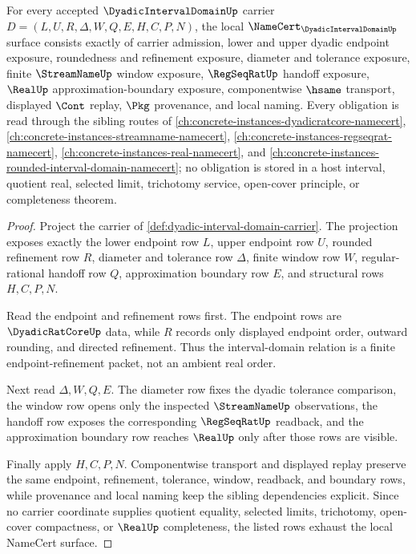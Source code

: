 \begin{theorem}
\label{thm:dyadic-interval-domain-namecert-obligations}
For every accepted $\DyadicIntervalDomainUp$ carrier $D=(L,U,R,\Delta,W,Q,E,H,C,P,N)$, the local $\NameCert_{\DyadicIntervalDomainUp}$ surface consists exactly of carrier admission, lower and upper dyadic endpoint exposure, roundedness and refinement exposure, diameter and tolerance exposure, finite $\StreamNameUp$ window exposure, $\RegSeqRatUp$ handoff exposure, $\RealUp$ approximation-boundary exposure, componentwise $\hsame$ transport, displayed $\Cont$ replay, $\Pkg$ provenance, and local naming. Every obligation is read through the sibling routes of \autoref{ch:concrete-instances-dyadicratcore-namecert}, \autoref{ch:concrete-instances-streamname-namecert}, \autoref{ch:concrete-instances-regseqrat-namecert}, \autoref{ch:concrete-instances-real-namecert}, and \autoref{ch:concrete-instances-rounded-interval-domain-namecert}; no obligation is stored in a host interval, quotient real, selected limit, trichotomy service, open-cover principle, or completeness theorem.
\end{theorem}
\begin{proof}
Project the carrier of \autoref{def:dyadic-interval-domain-carrier}. The projection exposes exactly the lower endpoint row $L$, upper endpoint row $U$, rounded refinement row $R$, diameter and tolerance row $\Delta$, finite window row $W$, regular-rational handoff row $Q$, approximation boundary row $E$, and structural rows $H,C,P,N$.

Read the endpoint and refinement rows first. The endpoint rows are $\DyadicRatCoreUp$ data, while $R$ records only displayed endpoint order, outward rounding, and directed refinement. Thus the interval-domain relation is a finite endpoint-refinement packet, not an ambient real order.

Next read $\Delta,W,Q,E$. The diameter row fixes the dyadic tolerance comparison, the window row opens only the inspected $\StreamNameUp$ observations, the handoff row exposes the corresponding $\RegSeqRatUp$ readback, and the approximation boundary row reaches $\RealUp$ only after those rows are visible.

Finally apply $H,C,P,N$. Componentwise transport and displayed replay preserve the same endpoint, refinement, tolerance, window, readback, and boundary rows, while provenance and local naming keep the sibling dependencies explicit. Since no carrier coordinate supplies quotient equality, selected limits, trichotomy, open-cover compactness, or $\RealUp$ completeness, the listed rows exhaust the local NameCert surface.
\end{proof}

